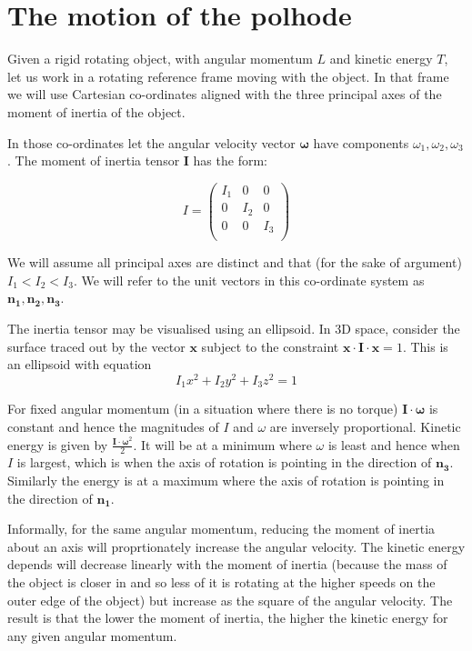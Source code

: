 \documentclass[a4paper, 12pt]{article}
\begin{document}
\section{The motion of the polhode}
Given a rigid rotating object, with angular momentum $L$ and kinetic energy $T$, let us work in a rotating reference frame moving with the object. In that frame we will use Cartesian co-ordinates aligned with the three principal axes of the moment of inertia of the object.

In those co-ordinates let the angular velocity vector $\bm{\omega}$ have components $\omega_1, \omega_2,\omega_3$. The moment of inertia tensor $\bm{I}$ has the form:

$$
I = \begin{pmatrix}
I_1 & 0 & 0 \\
0   & I_2 & 0 \\
0 & 0 & I_3 \\  
\end{pmatrix}
$$

We will assume all principal axes are distinct and that (for the sake of argument) $I_1 < I_2 < I_3$. We will refer to the unit vectors in this co-ordinate system as $\bm{n_1}, \bm{n_2}, \bm{n_3}$.

The inertia tensor may be visualised using an ellipsoid. In 3D space, consider the surface traced out by the vector $\bm{x}$ subject to the constraint $\bm{x}\cdot\bm{I}\cdot\bm{x} = 1$. This is an ellipsoid with equation $$I_1x^2 + I_2y^2 + I_3z^2 = 1$$

For fixed angular momentum (in a situation where there is no torque) $\bm{I}\cdot\bm{\omega}$ is constant and hence the magnitudes of $I$  and $\omega$ are inversely proportional. Kinetic energy is given by $\frac{\bm{I}\cdot\bm{\omega}^2}{2}$. It will be at a minimum where $\omega$ is least and hence when $I$ is largest, which is when the axis of rotation is pointing in the direction of $\bm{n_3}$. Similarly the energy is at a maximum where the axis of rotation is pointing in the direction of $\bm{n_1}$.

Informally, for the same angular momentum, reducing the moment of inertia about an axis will proprtionately increase the angular velocity. The kinetic energy depends will decrease linearly with the moment of inertia (because the mass of the object is closer in and so less of it is rotating at the higher speeds on the outer edge of the object) but increase as the square of the angular velocity. The result is that the lower the moment of inertia, the higher the kinetic energy for any given angular momentum.
\end{document}
